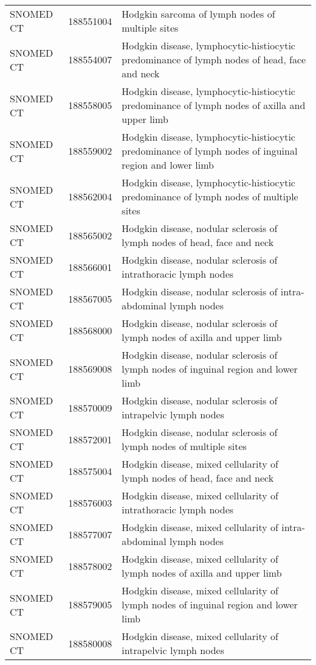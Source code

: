 \begin{table}[ht]
\begin{tabular}{lll}
  SNOMED CT & 188551004 & Hodgkin sarcoma of lymph nodes of multiple sites \\ 
  SNOMED CT & 188554007 & Hodgkin disease, lymphocytic-histiocytic predominance of lymph nodes of head, face and neck \\ 
  SNOMED CT & 188558005 & Hodgkin disease, lymphocytic-histiocytic predominance of lymph nodes of axilla and upper limb \\ 
  SNOMED CT & 188559002 & Hodgkin disease, lymphocytic-histiocytic predominance of lymph nodes of inguinal region and lower limb \\ 
  SNOMED CT & 188562004 & Hodgkin disease, lymphocytic-histiocytic predominance of lymph nodes of multiple sites \\ 
  SNOMED CT & 188565002 & Hodgkin disease, nodular sclerosis of lymph nodes of head, face and neck \\ 
  SNOMED CT & 188566001 & Hodgkin disease, nodular sclerosis of intrathoracic lymph nodes \\ 
  SNOMED CT & 188567005 & Hodgkin disease, nodular sclerosis of intra-abdominal lymph nodes \\ 
  SNOMED CT & 188568000 & Hodgkin disease, nodular sclerosis of lymph nodes of axilla and upper limb \\ 
  SNOMED CT & 188569008 & Hodgkin disease, nodular sclerosis of lymph nodes of inguinal region and lower limb \\ 
  SNOMED CT & 188570009 & Hodgkin disease, nodular sclerosis of intrapelvic lymph nodes \\ 
  SNOMED CT & 188572001 & Hodgkin disease, nodular sclerosis of lymph nodes of multiple sites \\ 
  SNOMED CT & 188575004 & Hodgkin disease, mixed cellularity of lymph nodes of head, face and neck \\ 
  SNOMED CT & 188576003 & Hodgkin disease, mixed cellularity of intrathoracic lymph nodes \\ 
  SNOMED CT & 188577007 & Hodgkin disease, mixed cellularity of intra-abdominal lymph nodes \\ 
  SNOMED CT & 188578002 & Hodgkin disease, mixed cellularity of lymph nodes of axilla and upper limb \\ 
  SNOMED CT & 188579005 & Hodgkin disease, mixed cellularity of lymph nodes of inguinal region and lower limb \\ 
  SNOMED CT & 188580008 & Hodgkin disease, mixed cellularity of intrapelvic lymph nodes \\ 

\end{tabular}
\end{table}
